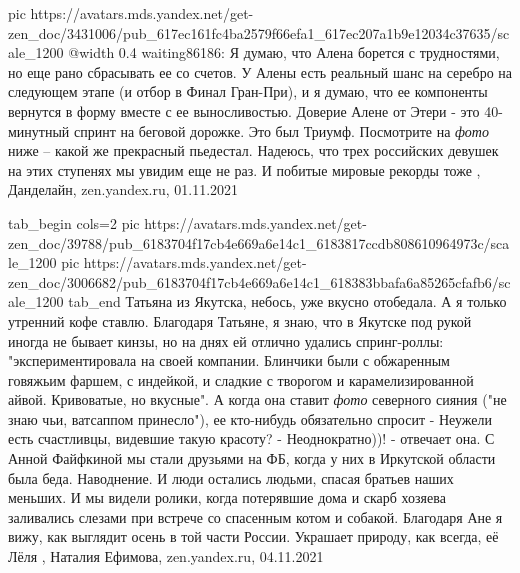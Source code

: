 \ifcmt
  pic https://avatars.mds.yandex.net/get-zen_doc/3431006/pub_617ec161fc4ba2579f66efa1_617ec207a1b9e12034c37635/scale_1200
  @width 0.4
\fi
waiting86186: Я думаю, что Алена борется с трудностями, но еще рано сбрасывать
ее со счетов. У Алены есть реальный шанс на серебро на следующем этапе (и отбор
в Финал Гран-При), и я думаю, что ее компоненты вернутся в форму вместе с ее
выносливостью. Доверие Алене от Этери - это 40-минутный спринт на беговой
дорожке.  Это был Триумф. Посмотрите на \emph{фото} ниже – какой же прекрасный
пьедестал.  Надеюсь, что трех российских девушек на этих ступенях мы увидим еще
не раз. И побитые мировые рекорды тоже
, 
Данделайн, zen.yandex.ru, 01.11.2021

\ifcmt
  tab_begin cols=2
     pic https://avatars.mds.yandex.net/get-zen_doc/39788/pub_6183704f17cb4e669a6e14c1_6183817ccdb808610964973c/scale_1200
     pic https://avatars.mds.yandex.net/get-zen_doc/3006682/pub_6183704f17cb4e669a6e14c1_618383bbafa6a85265cfafb6/scale_1200
  tab_end
\fi
Татьяна из Якутска, небось, уже вкусно отобедала. А я только утренний кофе
ставлю. Благодаря Татьяне, я знаю, что в Якутске под рукой иногда не бывает
кинзы, но на днях ей отлично удались спринг-роллы: "экспериментировала на своей
компании. Блинчики были с обжаренным говяжьим фаршем, с индейкой, и сладкие с
творогом и карамелизированной айвой. Кривоватые, но вкусные".  А когда она
ставит \emph{фото} северного сияния ("не знаю чьи, ватсаппом принесло"), ее
кто-нибудь обязательно спросит - Неужели есть счастливцы, видевшие такую
красоту?  - Неоднократно))! - отвечает она.  С Анной Файфкиной мы стали
друзьями на ФБ, когда у них в Иркутской области была беда. Наводнение. И люди
остались людьми, спасая братьев наших меньших. И мы видели ролики, когда
потерявшие дома и скарб хозяева заливались слезами при встрече со спасенным
котом и собакой.  Благодаря Ане я вижу, как выглядит осень в той части России.
Украшает природу, как всегда, её Лёля
, Наталия Ефимова, zen.yandex.ru, 04.11.2021
